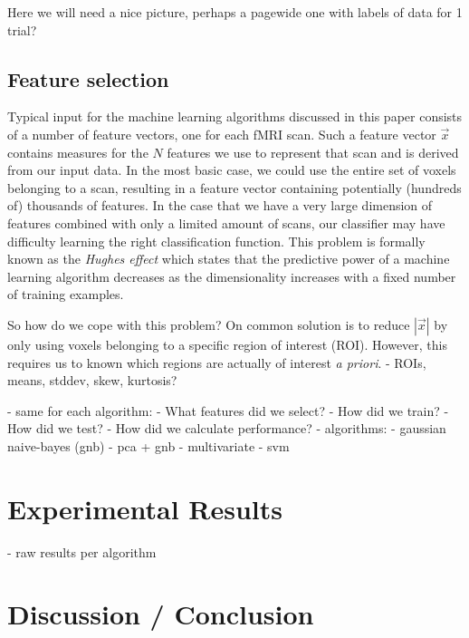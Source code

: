 \documentclass[preprint,journal]{vgtc}
\begin{document}
Here we will need a nice picture, perhaps a pagewide one with labels of data for 1 trial?

\subsection{Feature selection}
Typical input for the machine learning algorithms discussed in this paper consists of a number of feature vectors, one for each fMRI scan. Such a feature vector $\vec{x}$ contains measures for the $N$ features we use to represent that scan and is derived from our input data. In the most basic case, we could use the entire set of voxels belonging to a scan, resulting in a feature vector containing potentially (hundreds of) thousands of features.
In the case that we have a very large dimension of features combined with only a limited amount of scans, our classifier may have difficulty learning the right classification function. This problem is formally known as the \textit{Hughes effect}\cite{Hughes1054102} which states that the predictive power of a machine learning algorithm decreases as the dimensionality increases with a fixed number of training examples.

So how do we cope with this problem? On common solution is to reduce $|\vec{x}|$ by only using voxels belonging to a specific region of interest (ROI). However, this requires us to known which regions are actually of interest \textit{a priori}.
- ROIs, means, stddev, skew, kurtosis?

- same for each algorithm:
    - What features did we select?
    - How did we train?
    - How did we test?
        - How did we calculate performance?
- algorithms:
    - gaussian naive-bayes (gnb)
        - pca + gnb
    - multivariate
    - svm

\section{Experimental Results}
\label{sec:results}
- raw results per algorithm

\section{Discussion / Conclusion}
\label{sec:discussion}


\nocite{*}

\end{document}
